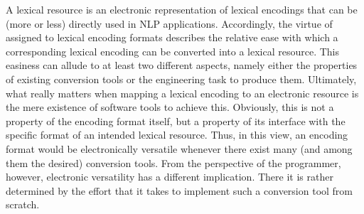 \documentclass[output=paper
,modfonts
,nonflat
,biblatexbackend=biber
]{langsci/langscibook}
\begin{document}
{{\ili{} \ili{} A\ili{} lexical\ili{} resource\ili{} is\ili{} an\ili{} electronic\ili{} representation\ili{} of\ili{} lexical\ili{} encodings\ili{} that\ili{} can\ili{} be\ili{} \ili{}(more\ili{} or\ili{} less\ili{})\ili{} directly\ili{} used\ili{} in\ili{} NLP\ili{} applications\ili{}.\ili{} Accordingly\ili{},\ili{} the\ili{} virtue\ili{} of\ili{} \ili{}\textsc{}\ili{} assigned\ili{} to\ili{} lexical\ili{} encoding\ili{} formats\ili{} describes\ili{} the\ili{} relative\ili{} ease\ili{} with\ili{} which\ili{} a\ili{} corresponding\ili{} lexical\ili{} encoding\ili{} can\ili{} be\ili{} converted\ili{} into\ili{} a\ili{} lexical\ili{} resource\ili{}.\ili{} This\ili{} easiness\ili{} can\ili{} allude\ili{} to\ili{} at\ili{} least\ili{} two\ili{} different\ili{} aspects\ili{},\ili{} namely\ili{} either\ili{} the\ili{} properties\ili{} of\ili{} existing\ili{} conversion\ili{} tools\ili{} or\ili{} the\ili{} engineering\ili{} task\ili{} to\ili{} produce\ili{} them\ili{}.\ili{} Ultimately\ili{},\ili{} what\ili{} really\ili{} matters\ili{} when\ili{} mapping\ili{} a\ili{} lexical\ili{} encoding\ili{} to\ili{} an\ili{} electronic\ili{} resource\ili{} is\ili{} the\ili{} mere\ili{} existence\ili{} of\ili{} software\ili{} tools\ili{} to\ili{} achieve\ili{} this\ili{}.\ili{} Obviously\ili{},\ili{} this\ili{} is\ili{} not\ili{} a\ili{} property\ili{} of\ili{} the\ili{} encoding\ili{} format\ili{} itself\ili{},\ili{} but\ili{} a\ili{} property\ili{} of\ili{} its\ili{} interface\ili{} with\ili{} the\ili{} specific\ili{} format\ili{} of\ili{} an\ili{} intended\ili{} lexical\ili{} resource\ili{}.\ili{} Thus\ili{},\ili{} in\ili{} this\ili{} view\ili{},\ili{} an\ili{} encoding\ili{} format\ili{} would\ili{} be\ili{} electronically\ili{} versatile\ili{} whenever\ili{} there\ili{} exist\ili{} many\ili{} \ili{}(and\ili{} among\ili{} them\ili{} the\ili{} desired\ili{})\ili{} conversion\ili{} tools\ili{}.\ili{} From\ili{} the\ili{} perspective\ili{} of\ili{} the\ili{} programmer\ili{},\ili{} however\ili{},\ili{} electronic\ili{} versatility\ili{} has\ili{} a\ili{} different\ili{} implication\ili{}.\ili{} There\ili{} it\ili{} is\ili{} rather\ili{} determined\ili{} by\ili{} the\ili{} effort\ili{} that\ili{} it\ili{} takes\ili{} to\ili{} implement\ili{} such\ili{} a\ili{} conversion\ili{} tool\ili{} from\ili{} scratch\ili{}.\ili{}
\ili{}
}}
\end{document}
